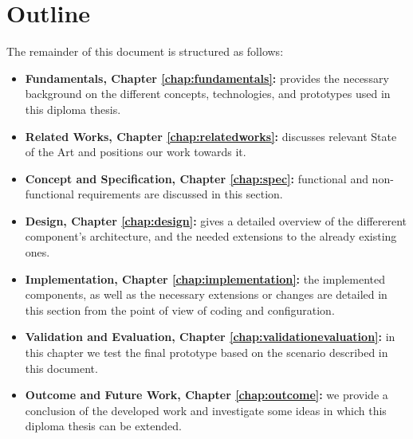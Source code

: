 \section{Outline}
\label{sec:outline}

The remainder of this document is structured as follows:

\begin{itemize}
\item \textbf{Fundamentals, Chapter \ref{chap:fundamentals}:} provides the necessary background on the different concepts, technologies, and prototypes used in this diploma thesis.
\item \textbf{Related Works, Chapter \ref{chap:relatedworks}:} discusses relevant State of the Art and positions our work towards it.  
\item \textbf{Concept and Specification, Chapter \ref{chap:spec}:} functional and non-functional requirements are discussed in this section.
\item \textbf{Design, Chapter \ref{chap:design}:} gives a detailed overview of the differerent component's architecture, and the needed extensions to the already existing ones.
\item \textbf{Implementation, Chapter \ref{chap:implementation}:} the implemented components, as well as the necessary extensions or changes are detailed in this section from the point of view of coding and configuration. 
\item \textbf{Validation and Evaluation, Chapter \ref{chap:validationevaluation}:} in this chapter we test the final prototype based on the scenario described in this document. 
\item \textbf{Outcome and Future Work, Chapter \ref{chap:outcome}:} we provide a conclusion of the developed work and investigate some ideas in which this diploma thesis can be extended.
\end{itemize}